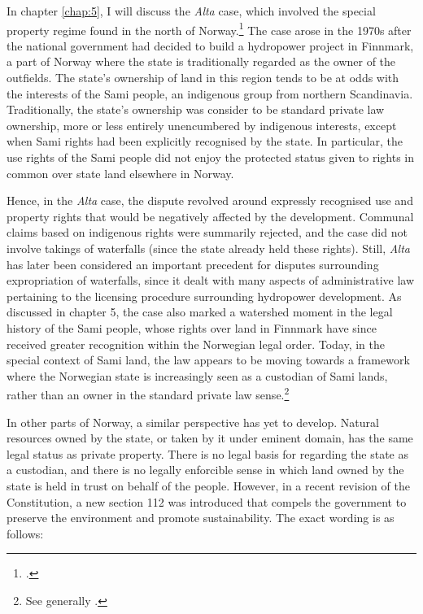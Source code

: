 In chapter \ref{chap:5}, I will discuss the {\it Alta} case, which involved the special property regime found in the north of Norway.\footnote{\cite{alta82}.} The case arose in the 1970s after the national government had decided to build a hydropower project in Finnmark, a part of Norway where the state is traditionally regarded as the owner of the outfields. The state's ownership of land in this region tends to be at odds with the interests of the Sami people, an indigenous group from northern Scandinavia. Traditionally, the state's ownership was consider to be standard private law ownership, more or less entirely unencumbered by indigenous interests, except when Sami rights had been explicitly recognised by the state. In particular, the use rights of the Sami people did not enjoy the protected status given to rights in common over state land elsewhere in Norway.%

Hence, in the {\it Alta} case, the dispute revolved around expressly recognised use and property rights that would be negatively affected by the development. Communal claims based on indigenous rights were summarily rejected, and the case did not involve takings of waterfalls (since the state already held these rights). Still, {\it Alta} has later been considered an important precedent for disputes surrounding expropriation of waterfalls, since it dealt with many aspects of administrative law pertaining to the licensing procedure surrounding hydropower development. As discussed in chapter 5, the case also marked a watershed moment in the legal history of the Sami people, whose rights over land in Finnmark have since received greater recognition within the Norwegian legal order. Today, in the special context of Sami land, the law appears to be moving towards a framework where the Norwegian state is increasingly seen as a custodian of Sami lands, rather than an owner in the standard private law sense.\footnote{See generally \cite{ravna05,bull07,ravna12s}.}

In other parts of Norway, a similar perspective has yet to develop. Natural resources owned by the state, or taken by it under eminent domain, has the same legal status as private property. There is no legal basis for regarding the state as a custodian, and there is no legally enforcible sense in which land owned by the state is held in trust on behalf of the people. However, in a recent revision of the Constitution, a new section 112 was introduced that compels the government to preserve the environment and promote sustainability. The exact wording is as follows:

